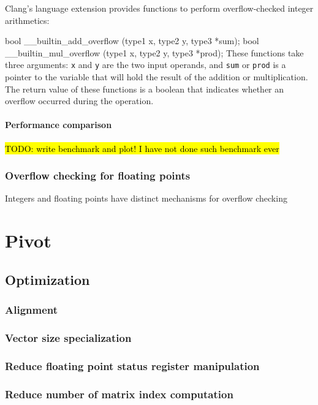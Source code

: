 \documentclass[logo,bsc,singlespacing,parskip]{infthesis}
\newenvironment{VerbatimCompact}
  {\vspace*{-2.5mm}\VerbatimEnvironment
   \par\Verbatim}
  {\endVerbatim\vspace*{-2.4mm}}
\begin{document}
Clang's language extension provides functions to perform overflow-checked
integer arithmetics: 
\begin{VerbatimCompact}
bool __builtin_add_overflow (type1 x, type2 y, type3 *sum);
bool __builtin_mul_overflow (type1 x, type2 y, type3 *prod);
\end{VerbatimCompact}
These functions take three arguments: \texttt{x} and \texttt{y} are the two
input operands, and \texttt{sum} or \texttt{prod} is a pointer to the variable
that will hold the result of the addition or multiplication. The return value of
these functions is a boolean that indicates whether an overflow occurred during
the operation.

\subsubsection{Performance comparison}
\hl{TODO: write benchmark and plot! I have not done such benchmark ever}

\subsection{Overflow checking for floating points}
Integers and floating points have distinct mechanisms for overflow checking

\chapter{Pivot}

\section{Optimization}
\subsection{Alignment}
\subsection{Vector size specialization}
\subsection{Reduce floating point status register manipulation}
\subsection{Reduce number of matrix index computation}
\label{sec:optmz-get-index}
\end{document}
